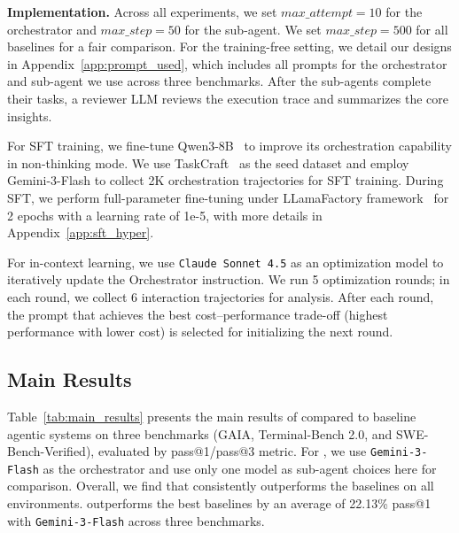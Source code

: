 \textbf{Implementation.} 
Across all experiments, we set $max\_attempt=10$ for the orchestrator and $max\_step=50$ for the sub-agent. We set $max\_step=500$ for all baselines for a fair comparison.
For the training-free setting, we detail our designs in Appendix~\ref{app:prompt_used}, which includes all prompts for the orchestrator and sub-agent we use across three benchmarks. After the sub-agents complete their tasks, a reviewer LLM reviews the execution trace and summarizes the core insights.



For SFT training, we fine-tune Qwen3-8B~\cite{yang2025qwen3} to improve its orchestration capability in non-thinking mode. We use TaskCraft~\cite{shi2025taskcraft} as the seed dataset and employ Gemini-3-Flash to collect 2K orchestration trajectories for SFT training. During SFT, we perform full-parameter fine-tuning under LLamaFactory framework~\cite{zheng2024llamafactory} for 2 epochs with a learning rate of 1e-5, with more details in Appendix~\ref{app:sft_hyper}.

For in-context learning, we use \texttt{Claude Sonnet 4.5} as an optimization model to iteratively update the Orchestrator instruction.
We run 5 optimization rounds; in each round, we collect 6 interaction trajectories for analysis.
After each round, the prompt that achieves the best cost--performance trade-off (highest performance with lower cost) is selected for initializing the next round.

\subsection{Main Results}

\label{sec:main_results}
Table~\ref{tab:main_results} presents the main results of \our compared to baseline agentic systems on three benchmarks (GAIA, Terminal-Bench 2.0, and SWE-Bench-Verified), evaluated by pass@1/pass@3 metric. For \our, we use \texttt{Gemini-3-Flash} as the orchestrator and use only one model as sub-agent choices here for comparison.
Overall, we find that \our consistently outperforms the baselines on all environments. \our{} outperforms the best baselines by an average of 22.13\% pass@1 with \texttt{Gemini-3-Flash} across three benchmarks.

